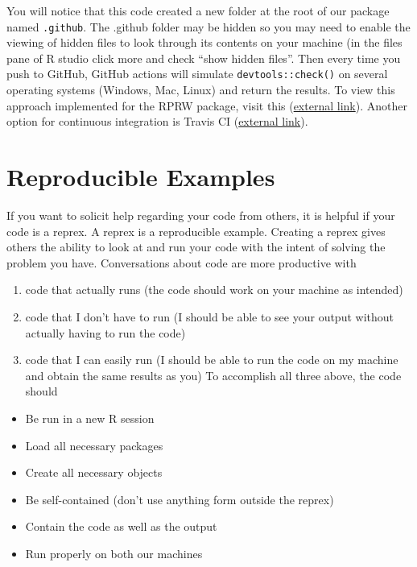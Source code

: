 \documentclass[
]{book}
\providecommand{\tightlist}{%
  \setlength{\itemsep}{0pt}\setlength{\parskip}{0pt}}
\begin{document}
You will notice that this code created a new folder at the root of our package named \texttt{.github}. The .github folder may be hidden so you may need to enable the viewing of hidden files to look through its contents on your machine (in the files pane of R studio click more and check ``show hidden files''. Then every time you push to GitHub, GitHub actions will simulate \texttt{devtools::check()} on several operating systems (Windows, Mac, Linux) and return the results. To view this approach implemented for the RPRW package, visit this (\href{https://github.com/michaeldumelle/RPRW/actions}{external link}). Another option for continuous integration is Travis CI (\href{https://travis-ci.org/}{external link}).

\hypertarget{reprex}{%
\section{Reproducible Examples}\label{reprex}}

If you want to solicit help regarding your code from others, it is helpful if your code is a reprex. A reprex is a reproducible example. Creating a reprex gives others the ability to look at and run your code with the intent of solving the problem you have. Conversations about code are more productive with

\begin{enumerate}
\def\labelenumi{\arabic{enumi}.}
\tightlist
\item
  code that actually runs (the code should work on your machine as intended)
\item
  code that I don't have to run (I should be able to see your output without actually having to run the code)
\item
  code that I can easily run (I should be able to run the code on my machine and obtain the same results as you)
  To accomplish all three above, the code should
\end{enumerate}

\begin{itemize}
\tightlist
\item
  Be run in a new R session
\item
  Load all necessary packages
\item
  Create all necessary objects
\item
  Be self-contained (don't use anything form outside the reprex)
\item
  Contain the code as well as the output
\item
  Run properly on both our machines
\end{itemize}
\end{document}
